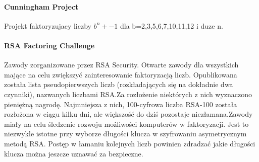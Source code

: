 \documentclass{article}
\begin{document}
\paragraph{Cunningham Project} Projekt faktoryzujacy liczby $b^n +-1$ dla b=2,3,5,6,7,10,11,12 i duze n.\cite{cun}

\paragraph{RSA Factoring Challenge} Zawody zorganizowane przez RSA Security. Otwarte zawody dla wszystkich mające na celu zwiększyć zainteresowanie faktoryzacją liczb. Opublikowana została lista pseudopierwszych liczb (rozkładających się na dokładnie dwa czynniki), nazwanych liczbami RSA.Za rozłożenie niektórych z nich wyznaczono pieniężną nagrodę. Najmniejsza z nich, 100-cyfrowa liczba RSA-100 została rozłożona w ciągu kilku dni, ale większość do dziś pozostaje niezłamana.Zawody miały na celu śledzenie rozwoju możliwości komputerów w faktoryzacji. Jest to niezwykle istotne przy wyborze długości klucza w szyfrowaniu asymetrycznym metodą RSA. Postęp w łamaniu kolejnych liczb powinien zdradzać jakie długości klucza można jeszcze uznawać za bezpieczne.\cite{rsafactoringchallenge}




\end{document}
